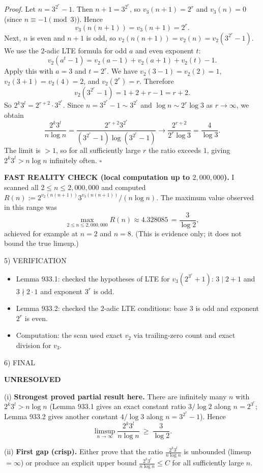 \emph{Proof.}
Let $n=3^{2^r}-1$. Then $n+1=3^{2^r}$, so $v_3(n+1)=2^r$ and $v_3(n)=0$ (since $n\equiv -1\pmod 3$). Hence
\[
v_3(n(n+1))=v_3(n+1)=2^r.
\]
Next, $n$ is even and $n+1$ is odd, so $v_2(n(n+1))=v_2(n)=v_2(3^{2^r}-1)$.
We use the $2$-adic LTE formula for odd $a$ and even exponent $t$:
\[
 v_2(a^t-1)=v_2(a-1)+v_2(a+1)+v_2(t)-1.
\]
Apply this with $a=3$ and $t=2^r$.
We have $v_2(3-1)=v_2(2)=1$, $v_2(3+1)=v_2(4)=2$, and $v_2(2^r)=r$.
Therefore
\[
 v_2(3^{2^r}-1)=1+2+r-1=r+2.
\]
So $2^k3^l=2^{r+2}\cdot 3^{2^r}$.
Since $n=3^{2^r}-1\sim 3^{2^r}$ and $\log n\sim 2^r\log 3$ as $r\to\infty$, we obtain
\[
\frac{2^k3^l}{n\log n}
=\frac{2^{r+2}3^{2^r}}{(3^{2^r}-1)\log(3^{2^r}-1)}
\longrightarrow \frac{2^{r+2}}{2^r\log 3}=\frac{4}{\log 3}.
\]
The limit is $>1$, so for all sufficiently large $r$ the ratio exceeds $1$, giving $2^k3^l>n\log n$ infinitely often.
\hfill$\square$

\medskip
\textbf{FAST REALITY CHECK (local computation up to $2{,}000{,}000$).}
I scanned all $2\le n\le 2{,}000{,}000$ and computed
\(R(n):=2^{v_2(n(n+1))}3^{v_3(n(n+1))}/(n\log n)\).
The maximum value observed in this range was
\[
\max_{2\le n\le 2{,}000{,}000} R(n)\approx 4.328085\,=\frac{3}{\log 2},
\]
achieved for example at $n=2$ and $n=8$.
(This is evidence only; it does not bound the true limsup.)

5) VERIFICATION

\begin{itemize}
\item Lemma 933.1: checked the hypotheses of LTE for $v_3(2^{3^r}+1)$: $3\mid 2+1$ and $3\nmid 2\cdot 1$ and exponent $3^r$ is odd.
\item Lemma 933.2: checked the $2$-adic LTE conditions: base $3$ is odd and exponent $2^r$ is even.
\item Computation: the scan used exact $v_2$ via trailing-zero count and exact division for $v_3$.
\end{itemize}

6) FINAL

\textbf{UNRESOLVED}

(i) \textbf{Strongest proved partial result here.}
There are infinitely many $n$ with $2^k3^l>n\log n$ (Lemma 933.1 gives an exact constant ratio $3/\log 2$ along $n=2^{3^r}$; Lemma 933.2 gives another constant $4/\log 3$ along $n=3^{2^r}-1$). Hence
\[
\limsup_{n\to\infty}\frac{2^k3^l}{n\log n}\ \ge\ \frac{3}{\log 2}.
\]

(ii) \textbf{First gap (crisp).}
Either prove that the ratio $\frac{2^k3^l}{n\log n}$ is unbounded (limsup $=\infty$) or produce an explicit upper bound $\frac{2^k3^l}{n\log n}\le C$ for all sufficiently large $n$.

